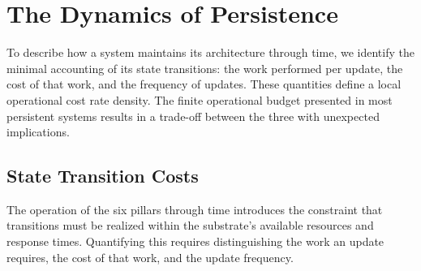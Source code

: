 \section{The Dynamics of Persistence}
\label{sec:dynamics_of_persistence}
To describe how a system maintains its architecture through time, we identify the minimal accounting of its state transitions: the work performed per update, the cost of that work, and the frequency of updates. These quantities define a local operational cost rate density. The finite operational budget presented in most persistent systems results in a trade-off between the three with unexpected implications.

\subsection{State Transition Costs}
\label{subsec:state_transition_costs}
The operation of the six pillars through time introduces the constraint that transitions must be realized within the substrate's available resources and response times. Quantifying this requires distinguishing the work an update requires, the cost of that work, and the update frequency.

